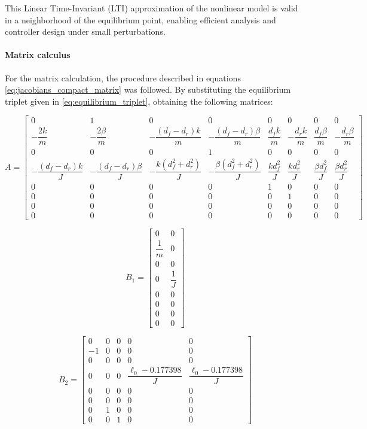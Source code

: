 \documentclass[]{report}
\begin{document}
This Linear Time-Invariant (LTI) approximation of the nonlinear model is valid in a neighborhood of the equilibrium point, enabling efficient analysis and controller design under small perturbations.\\

 
\paragraph{Matrix calculus}
		For the matrix calculation, the procedure described in equations \eqref{eq:jacobians_compact_matrix}  was followed. By substituting the equilibrium triplet given in \eqref{eq:equilibrium_triplet}, obtaining the following matrices:
		
\begin{equation}
	A =
	\begin{bmatrix}
		0 & 1 & 0 & 0 & 0 & 0 & 0 & 0 \\
		-\dfrac{2k}{m} & -\dfrac{2\beta}{m} & -\dfrac{(d_f - d_r)k}{m} & -\dfrac{(d_f - d_r)\beta}{m} & \dfrac{d_fk}{m} & -\dfrac{d_rk}{m} & \dfrac{d_f\beta}{m} & -\dfrac{d_r\beta}{m} \\
		0 & 0 & 0 & 1 & 0 & 0 & 0 & 0 \\
		-\dfrac{(d_f - d_r)k}{J} & -\dfrac{(d_f - d_r)\beta}{J} & -\dfrac{k(d_f^2 + d_r^2)}{J} & -\dfrac{\beta(d_f^2 + d_r^2)}{J} & \dfrac{kd_f^2}{J} & \dfrac{kd_r^2}{J} & \dfrac{\beta d_f^2}{J} & \dfrac{\beta d_r^2}{J} \\
		0 & 0 & 0 & 0 & 1 & 0 & 0 & 0 \\
		0 & 0 & 0 & 0 & 0 & 1 & 0 & 0 \\
		0 & 0 & 0 & 0 & 0 & 0 & 0 & 0 \\
		0 & 0 & 0 & 0 & 0 & 0 & 0 & 0
	\end{bmatrix}
\end{equation}

\begin{equation}
	B_1 =
	\begin{bmatrix}
		0 & 0 \\
		\dfrac{1}{m} & 0 \\
		0 & 0 \\
		0 & \dfrac{1}{J} \\
		0 & 0 \\
		0 & 0 \\
		0 & 0 \\
		0 & 0
	\end{bmatrix}
\end{equation}

\begin{equation}
	B_2 =
	\begin{bmatrix}
		0 & 0 & 0 & 0 & 0 \\
		-1 & 0 & 0 & 0 & 0 \\
		0 & 0 & 0 & 0 & 0 \\
		0 & 0 & 0 & \dfrac{\ell_0 - 0.177398}{J} & \dfrac{\ell_0 - 0.177398}{J} \\
		0 & 0 & 0 & 0 & 0 \\
		0 & 0 & 0 & 0 & 0 \\
		0 & 1 & 0 & 0 & 0 \\
		0 & 0 & 1 & 0 & 0
	\end{bmatrix}
\end{equation}
\end{document}
